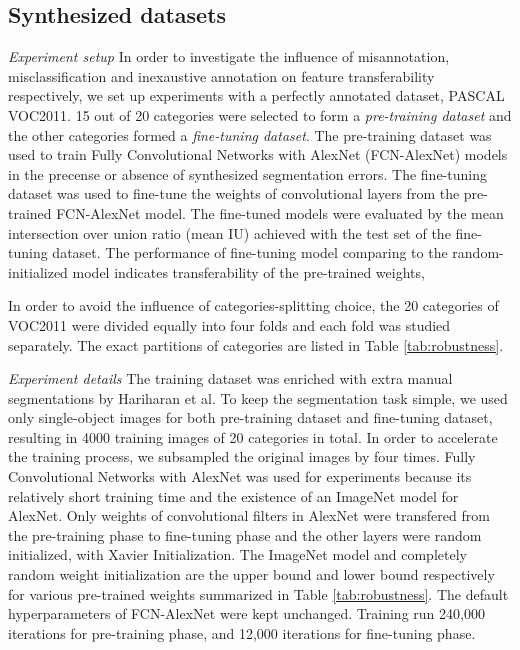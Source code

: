 \subsection{Synthesized datasets}
\label{subsec:robustness}

\noindent
\textit{Experiment setup}
\noindent
In order to investigate the influence of misannotation, misclassification and inexaustive annotation on feature transferability respectively, we set up experiments with a perfectly annotated dataset, PASCAL VOC2011\cite{everingham2015pascal}.
15 out of 20 categories were selected to form a \textit{pre-training dataset} and the other categories formed a \textit{fine-tuning dataset}.
The pre-training dataset was used to train Fully Convolutional Networks with AlexNet (FCN-AlexNet) models in the precense or absence of synthesized segmentation errors.
The fine-tuning dataset was used to fine-tune the weights of convolutional layers from the pre-trained FCN-AlexNet model.
The fine-tuned models were evaluated by the mean intersection over union ratio (mean IU) achieved with the test set of the fine-tuning dataset.
The performance of fine-tuning model comparing to the random-initialized model indicates transferability of the pre-trained weights,

\noindent
In order to avoid the influence of categories-splitting choice, the 20 categories of VOC2011 were divided equally into four folds and each fold was studied separately.
The exact partitions of categories are listed in Table \ref{tab:robustness}.

\noindent \textit{Experiment details}
\noindent
The training dataset was enriched with extra manual segmentations by Hariharan et al.\cite{hariharan2011semantic}
To keep the segmentation task simple, we used only single-object images for both pre-training dataset and fine-tuning dataset, resulting in 4000 training images of 20 categories in total.
In order to accelerate the training process, we subsampled the original images by four times.
Fully Convolutional Networks with AlexNet was used for experiments because its relatively short training time and the existence of an ImageNet model for AlexNet.
Only weights of convolutional filters in AlexNet were transfered from the pre-training phase to fine-tuning phase and the other layers were random initialized, with Xavier Initialization.
The ImageNet model and completely random weight initialization are the upper bound and lower bound respectively for various pre-trained weights summarized in Table \ref{tab:robustness}.
The default hyperparameters of FCN-AlexNet\cite{long2015fully} were kept unchanged.
Training run 240,000 iterations for pre-training phase, and 12,000 iterations for fine-tuning phase.


